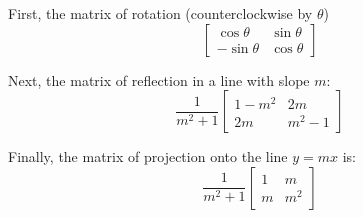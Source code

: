 \documentclass{article}
\begin{document}
\par 

\begin{df}

First, the matrix of rotation (counterclockwise by $\theta$)
\[
\begin{bmatrix}
   \cos{\theta} & \sin{\theta}\\
   -\sin{\theta} & \cos{\theta}
\end{bmatrix}
\]
\end{df}
\begin{df}
Next, the matrix of reflection in a line with slope $m$:
\[
\frac{1}{m^2+1}
\begin{bmatrix}
    1-m^2 & 2m\\
    2m & m^2-1
\end{bmatrix}
\]
\end{df}
\begin{df}
Finally, the matrix of projection onto the line $y=mx$ is:
\[
\frac{1}{m^2+1}   
\begin{bmatrix}
    1 & m\\
    m & m^2
\end{bmatrix}
\]
\end{df}
\end{document}
